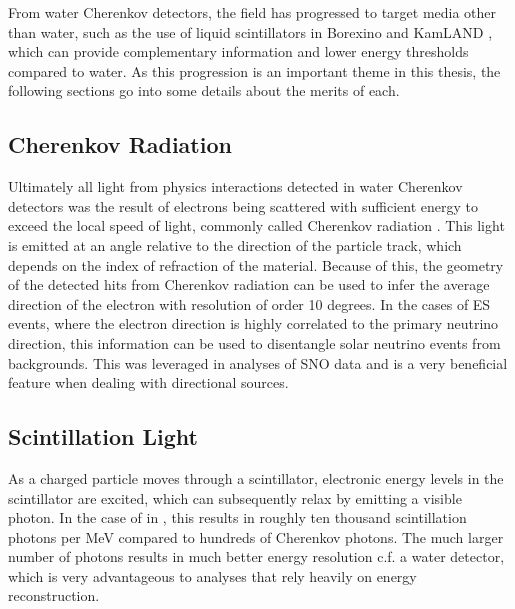 From water Cherenkov detectors, the field has progressed to target media other than water, such as the use of liquid scintillators in Borexino \cite{borexino} and KamLAND \cite{kamland}, which can provide complementary information and lower energy thresholds compared to water.
As this progression is an important theme in this thesis, the following sections go into some details about the merits of each.

\subsection{Cherenkov Radiation}

Ultimately all light from physics interactions detected in water Cherenkov detectors was the result of electrons being scattered with sufficient energy to exceed the local speed of light, commonly called Cherenkov radiation \cite{cherenkov}.
This light is emitted at an angle relative to the direction of the particle track, which depends on the index of refraction of the material.
Because of this, the geometry of the detected hits from Cherenkov radiation can be used to infer the average direction of the electron with resolution of order 10 degrees.
In the cases of ES events, where the electron direction is highly correlated to the primary neutrino direction, this information can be used to disentangle solar neutrino events from backgrounds.
This was leveraged in analyses of SNO data and is a very beneficial feature when dealing with directional sources.

\subsection{Scintillation Light}

As a charged particle moves through a scintillator, electronic energy levels in the scintillator are excited, which can subsequently relax by emitting a visible photon.
In the case of {\labppo} in {\snop}, this results in roughly ten thousand scintillation photons per MeV compared to hundreds of Cherenkov photons.
The much larger number of photons results in much better energy resolution c.f. a water detector, which is very advantageous to analyses that rely heavily on energy reconstruction.

